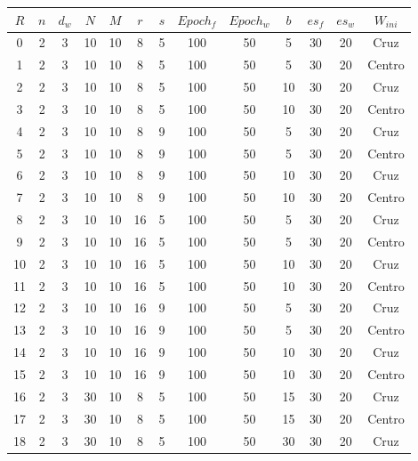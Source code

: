 \begin{table}[ht]
    \centering
        \begin{tabular}{ccccccccccccc}
            \toprule
            $R$ & $n$ & $d_{w}$ & $N$ & $M$ & $r$ & $s$ & $Epoch_f$ & $Epoch_w$ & $b$ & $es_{f}$ & $es_{w}$ & $W_{ini}$ \\
            \midrule
            0 & 2 & 3 & 10 & 10 & 8 & 5 & 100 & 50 & 5 & 30 & 20 & Cruz \\
            1 & 2 & 3 & 10 & 10 & 8 & 5 & 100 & 50 & 5 & 30 & 20 & Centro \\
            2 & 2 & 3 & 10 & 10 & 8 & 5 & 100 & 50 & 10 & 30 & 20 & Cruz \\
            3 & 2 & 3 & 10 & 10 & 8 & 5 & 100 & 50 & 10 & 30 & 20 & Centro \\
            4 & 2 & 3 & 10 & 10 & 8 & 9 & 100 & 50 & 5 & 30 & 20 & Cruz \\
            5 & 2 & 3 & 10 & 10 & 8 & 9 & 100 & 50 & 5 & 30 & 20 & Centro \\
            6 & 2 & 3 & 10 & 10 & 8 & 9 & 100 & 50 & 10 & 30 & 20 & Cruz \\
            7 & 2 & 3 & 10 & 10 & 8 & 9 & 100 & 50 & 10 & 30 & 20 & Centro \\
            8 & 2 & 3 & 10 & 10 & 16 & 5 & 100 & 50 & 5 & 30 & 20 & Cruz \\
            9 & 2 & 3 & 10 & 10 & 16 & 5 & 100 & 50 & 5 & 30 & 20 & Centro \\
            10 & 2 & 3 & 10 & 10 & 16 & 5 & 100 & 50 & 10 & 30 & 20 & Cruz \\
            11 & 2 & 3 & 10 & 10 & 16 & 5 & 100 & 50 & 10 & 30 & 20 & Centro \\
            12 & 2 & 3 & 10 & 10 & 16 & 9 & 100 & 50 & 5 & 30 & 20 & Cruz \\
            13 & 2 & 3 & 10 & 10 & 16 & 9 & 100 & 50 & 5 & 30 & 20 & Centro \\
            14 & 2 & 3 & 10 & 10 & 16 & 9 & 100 & 50 & 10 & 30 & 20 & Cruz \\
            15 & 2 & 3 & 10 & 10 & 16 & 9 & 100 & 50 & 10 & 30 & 20 & Centro \\
            16 & 2 & 3 & 30 & 10 & 8 & 5 & 100 & 50 & 15 & 30 & 20 & Cruz \\
            17 & 2 & 3 & 30 & 10 & 8 & 5 & 100 & 50 & 15 & 30 & 20 & Centro \\
            18 & 2 & 3 & 30 & 10 & 8 & 5 & 100 & 50 & 30 & 30 & 20 & Cruz \\

\end{tabular}
\end{table}
